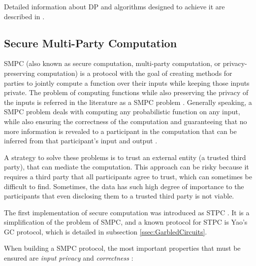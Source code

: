 Detailed information about \ac{DP} and algorithms designed to achieve it are described in \cite{dwork2014algorithmic}.


\subsection{Secure Multi-Party Computation} 
\label{ssec:SecureMultiPartyComputation}


\acf{SMPC} (also known as secure computation, multi-party computation, or privacy-preserving computation) is a protocol with the goal of creating methods for parties to jointly compute a function over their inputs while keeping those inputs private. The problem of computing functions while also preserving the privacy of the inputs is referred in the literature as a \ac{SMPC} problem \cite{yao1982protocols}. Generally speaking, a \ac{SMPC} problem deals with computing any probabilistic function on any input, while also ensuring the correctness of the computation and guaranteeing that no more information is revealed to a participant in the computation that can be inferred from that participant's input and output \cite{goldwasser1997multi}. 

A strategy to solve these problems is to trust an external entity (a trusted third party), that can mediate the computation. This approach can be risky because it requires a third party that all participants agree to trust, which can sometimes be difficult to find. Sometimes, the data has such high degree of importance to the participants that even disclosing them to a trusted third party is not viable.

The first implementation of secure computation was introduced as \ac{STPC} \cite{yao1982protocols}. It is a simplification of the problem of \ac{SMPC}, and a known protocol for \ac{STPC} is Yao's \ac{GC} protocol, which is detailed in subsection \ref{ssec:GarbledCircuits}. 

When building a \ac{SMPC} protocol, the most important properties that must be ensured are \textit{input privacy} and \textit{correctness} \cite{goldreich1998secure}:

